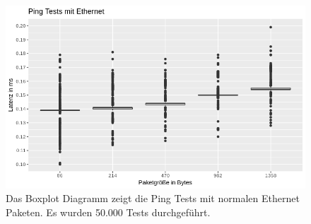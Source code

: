 \begin{figure}[!p]
\centering
\includegraphics[width=1\textwidth]{images/Ethernetping.png}
\caption[Ping Diagramm mit Ethernet]{Das Boxplot Diagramm zeigt die Ping Tests mit normalen Ethernet Paketen. Es wurden 50.000 Tests durchgeführt. }
\label{img:CPU-WE8}
\end{figure}


\clearpage




